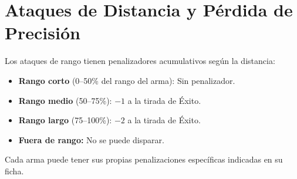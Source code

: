\section{Ataques de Distancia y Pérdida de Precisión}

Los ataques de rango tienen penalizadores acumulativos según la distancia:

\begin{itemize}
    \item \textbf{Rango corto} (0--50\% del rango del arma): Sin penalizador.
    \item \textbf{Rango medio} (50--75\%): $-1$ a la tirada de Éxito.
    \item \textbf{Rango largo} (75--100\%): $-2$ a la tirada de Éxito.
    \item \textbf{Fuera de rango:} No se puede disparar.
\end{itemize}

Cada arma puede tener sus propias penalizaciones específicas indicadas en su ficha.
